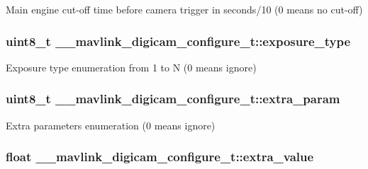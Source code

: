 Main engine cut-\/off time before camera trigger in seconds/10 (0 means no cut-\/off) 

\hypertarget{struct____mavlink__digicam__configure__t_ab778ab4e339c40be0ed7567dd7defe74}{
\subsubsection[{exposure\+\_\+type}]{\setlength{\rightskip}{0pt plus 5cm}uint8\+\_\+t \+\_\+\+\_\+mavlink\+\_\+digicam\+\_\+configure\+\_\+t\+::exposure\+\_\+type}}\label{struct____mavlink__digicam__configure__t_ab778ab4e339c40be0ed7567dd7defe74}


Exposure type enumeration from 1 to N (0 means ignore) 

\hypertarget{struct____mavlink__digicam__configure__t_a044c61a1966321f1fa688b62e80e0546}{
\subsubsection[{extra\+\_\+param}]{\setlength{\rightskip}{0pt plus 5cm}uint8\+\_\+t \+\_\+\+\_\+mavlink\+\_\+digicam\+\_\+configure\+\_\+t\+::extra\+\_\+param}}\label{struct____mavlink__digicam__configure__t_a044c61a1966321f1fa688b62e80e0546}


Extra parameters enumeration (0 means ignore) 

\hypertarget{struct____mavlink__digicam__configure__t_a70d6f6dce20e064e7ba77083abe7f0e6}{
\subsubsection[{extra\+\_\+value}]{\setlength{\rightskip}{0pt plus 5cm}float \+\_\+\+\_\+mavlink\+\_\+digicam\+\_\+configure\+\_\+t\+::extra\+\_\+value}}\label{struct____mavlink__digicam__configure__t_a70d6f6dce20e064e7ba77083abe7f0e6}


